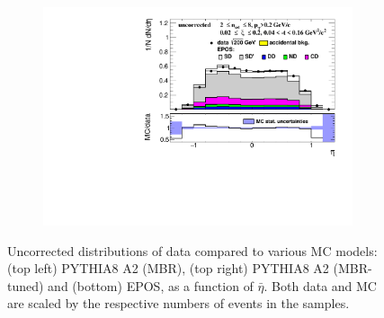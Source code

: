 \begin{figure}[h!]
\begin{subfigure}{.45\textwidth}
		\includegraphics[width=\linewidth, page=1]{chapters/chrgSTAR/img/nonSD/chrg/SDT_epos_xi0_RP_starsim_eta.pdf}
	\end{subfigure}
	\begin{minipage}{.45\textwidth}
		\caption[Uncorrected distributions of data compared to various MC models: PYTHIA8 A2 (MBR), PYTHIA8 A2 (MBR-tuned) and EPOS, as a function of $\bar{\eta}$.]{Uncorrected distributions of data compared to various MC models: (top left) PYTHIA8 A2 (MBR), (top right) PYTHIA8 A2 (MBR-tuned) and (bottom) EPOS, as a function of $\bar{\eta}$. Both data and MC are scaled by the respective numbers of events in the samples.}
		\label{fig:nonSDera}
	\end{minipage}
	
\end{figure}
\FloatBarrier
\captionsetup{format=default,indention=0pt,justification=justified}